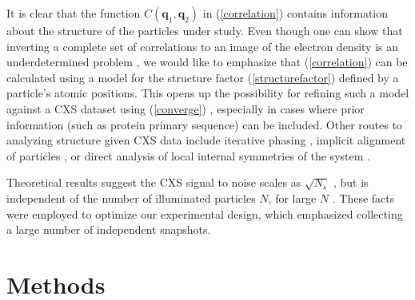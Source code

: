 \documentclass [11pt,fleqn]{article}
\begin{document}
It is clear that the function $C(\bm q_1, \bm q_2)$ in (\ref{correlation}) contains information about the structure of the particles under study. Even though one can show that inverting a complete set of correlations to an image of the electron density is an underdetermined problem \cite{Elser:2011ez}, we would like to emphasize that (\ref{correlation}) can be calculated using a model for the structure factor (\ref{structurefactor}) defined by a particle's atomic positions. This opens up the possibility for refining such a model against a CXS dataset using (\ref{converge}) \cite{Liu:2013dv, Chen:2013io, Saldin:2009jj}, especially in cases where prior information (such as protein primary sequence) can be included. Other routes to analyzing structure given CXS data include iterative phasing \cite{Saldin:2010bx}, implicit alignment of particles \cite{Poon:2013ia}, or direct analysis of local internal symmetries of the system \cite{Kurta:2012cb, Kurta:2013to}.


Theoretical results suggest the CXS signal to noise scales as $\sqrt{N_{s}}$ , but is independent of the number of illuminated particles $N $, for large $N$ \cite{Kam:1977wc, Kam:1981ua, Kirian:2011bq}. These facts were employed to optimize our experimental design, which emphasized collecting a large number of independent snapshots.

\section{Methods}
\end{document}

